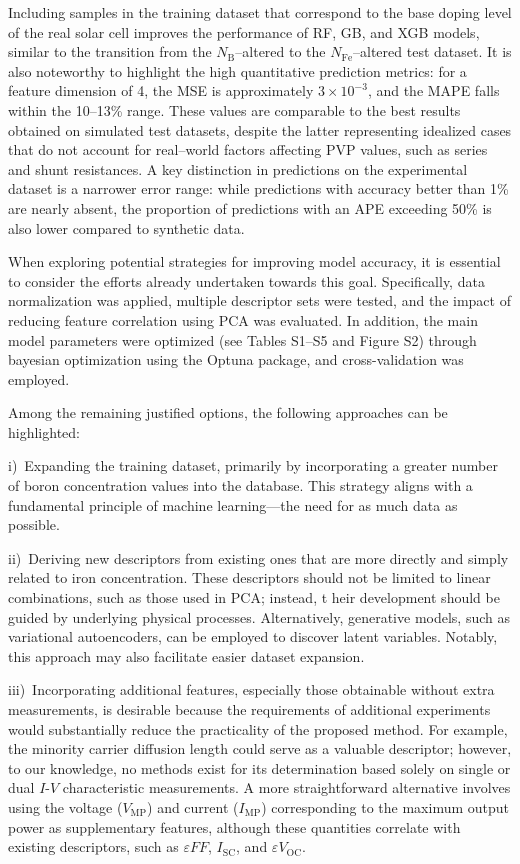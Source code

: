 \documentclass[a4paper,fleqn,draft]{cas-sc}
\begin{document}
Including samples in the training dataset that correspond to the base doping level of the real solar cell
improves the performance of RF, GB, and XGB models,
similar to the transition from the $N_\mathrm{B}$--altered to the $N_\mathrm{Fe}$--altered test dataset.
It is also noteworthy to highlight the high quantitative prediction metrics:
for a feature dimension of 4, the MSE is approximately  $3\times10^{-3}$, and the MAPE falls within the 10--13\% range.
These values are comparable to the best results obtained on simulated test datasets,
despite the latter representing idealized cases that do not account for real--world factors affecting PVP values,
such as series and shunt resistances.
A key distinction in predictions on the experimental dataset is a narrower error range:
while predictions with accuracy better than 1\% are nearly absent,
the proportion of predictions with an APE exceeding 50\% is also lower compared to synthetic data.


When exploring potential strategies for improving model accuracy,
it is essential to consider the efforts already undertaken towards this goal.
Specifically, data normalization was applied,
multiple descriptor sets were tested, and the impact of reducing feature correlation using PCA was evaluated.
In addition, the main model parameters were optimized (see Tables S1–S5 and Figure S2)
through bayesian optimization using the Optuna package, and cross-validation was employed.

Among the remaining justified options, the following approaches can be highlighted:

\noindent
i)~Expanding the training dataset, primarily by incorporating a greater number of boron concentration values into the database.
This strategy aligns with a fundamental principle of machine learning—the need for as much data as possible.

\noindent
ii)~Deriving new descriptors from existing ones that are more directly and simply related to iron concentration.
These descriptors should not be limited to linear combinations, such as those used in PCA; instead, t
heir development should be guided by underlying physical processes.
Alternatively, generative models, such as variational autoencoders,
can be employed to discover latent variables.
Notably, this approach may also facilitate easier dataset expansion.

\noindent
iii)~Incorporating additional features, especially those obtainable without extra measurements,
is desirable because the requirements of additional experiments would substantially reduce
the practicality of the proposed method.
For example, the minority carrier diffusion length could serve as a valuable descriptor;
however, to our knowledge, no methods exist for its determination based solely
on single or dual $I$-$V$ characteristic measurements.
A more straightforward alternative involves using the voltage ($V_\mathrm{MP}$) and current ($I_\mathrm{MP}$)
corresponding to the maximum output power as supplementary features,
although these quantities correlate with existing descriptors, such as $\varepsilon F\!F$, $I_\mathrm{SC}$,
and $\varepsilon V_\mathrm{OC}$.
\end{document}
